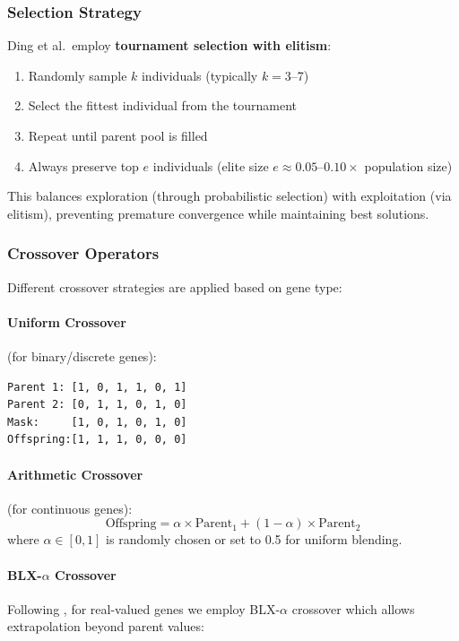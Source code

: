 \subsubsection{Selection Strategy}

Ding et al.\ employ \textbf{tournament selection with elitism}:
\begin{enumerate}
    \item Randomly sample $k$ individuals (typically $k=3$--7)
    \item Select the fittest individual from the tournament
    \item Repeat until parent pool is filled
    \item Always preserve top $e$ individuals (elite size $e \approx 0.05$--$0.10 \times$ population size)
\end{enumerate}

This balances exploration (through probabilistic selection) with exploitation (via elitism), preventing premature convergence while maintaining best solutions.

\subsubsection{Crossover Operators}

Different crossover strategies are applied based on gene type:

\paragraph{Uniform Crossover} (for binary/discrete genes):
\begin{verbatim}
Parent 1: [1, 0, 1, 1, 0, 1]
Parent 2: [0, 1, 1, 0, 1, 0]
Mask:     [1, 0, 1, 0, 1, 0]
Offspring:[1, 1, 1, 0, 0, 0]
\end{verbatim}

\paragraph{Arithmetic Crossover} (for continuous genes):
\begin{equation}
\text{Offspring} = \alpha \times \text{Parent}_1 + (1-\alpha) \times \text{Parent}_2
\end{equation}
where $\alpha \in [0,1]$ is randomly chosen or set to 0.5 for uniform blending.

\paragraph{BLX-$\alpha$ Crossover}
Following \citet{Takahashi2001}, for real-valued genes we employ BLX-$\alpha$ crossover which allows extrapolation beyond parent values:

